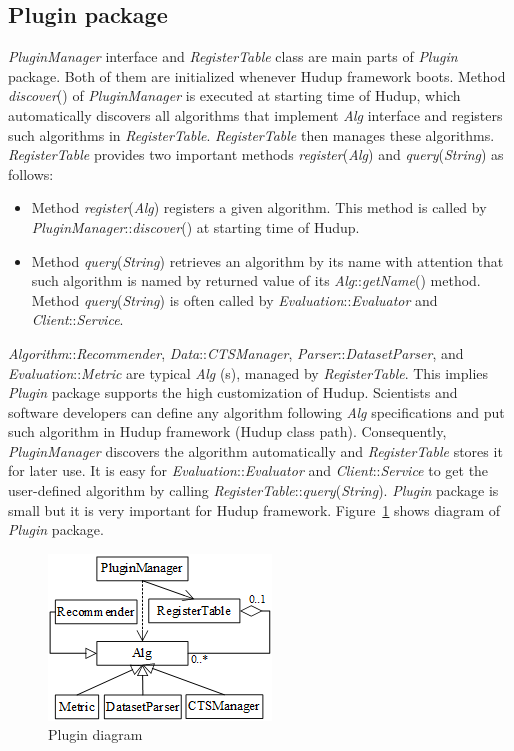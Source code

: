 \documentclass[a4paper,twoside]{article}
\begin{document}
\subsection{Plugin package}
\label{subsec:plugin-package}
\textit{PluginManager} interface and \textit{RegisterTable} class are main parts of \textit{Plugin} package. Both of them are initialized whenever Hudup framework boots. Method \textit{discover}() of \textit{PluginManager} is executed at starting time of Hudup, which automatically discovers all algorithms that implement \textit{Alg} interface and registers such algorithms in \textit{RegisterTable}. \textit{RegisterTable} then manages these algorithms. \textit{RegisterTable} provides two important methods \textit{register}(\textit{Alg}) and \textit{query}(\textit{String}) as follows:
\begin{itemize}
\item Method \textit{register}(\textit{Alg}) registers a given algorithm. This method is called by \textit{PluginManager}::\textit{discover}() at starting time of Hudup.
\item Method \textit{query}(\textit{String}) retrieves an algorithm by its name with attention that such algorithm is named by returned value of its \textit{Alg}::\textit{getName}() method. Method \textit{query}(\textit{String}) is often called by \textit{Evaluation}::\textit{Evaluator} and \textit{Client}::\textit{Service}.
\end{itemize}
\textit{Algorithm}::\textit{Recommender}, \textit{Data}::\textit{CTSManager}, \textit{Parser}::\textit{DatasetParser}, and \textit{Evaluation}::\textit{Metric} are typical \textit{Alg} (s), managed by \textit{RegisterTable}. This implies \textit{Plugin} package supports the high customization of Hudup. Scientists and software developers can define any algorithm following \textit{Alg} specifications and put such algorithm in Hudup framework (Hudup class path). Consequently, \textit{PluginManager} discovers the algorithm automatically and \textit{RegisterTable} stores it for later use. It is easy for \textit{Evaluation}::\textit{Evaluator} and \textit{Client}::\textit{Service} to get the user-defined algorithm by calling \textit{RegisterTable}::\textit{query}(\textit{String}). \textit{Plugin} package is small but it is very important for Hudup framework. Figure~\ref{figure:plugin-diagram} shows diagram of \textit{Plugin} package.
\begin{figure}
\centering
\includegraphics{PluginDiagram.png}
\caption{Plugin diagram}
\label{figure:plugin-diagram}
\end{figure}
\end{document}
